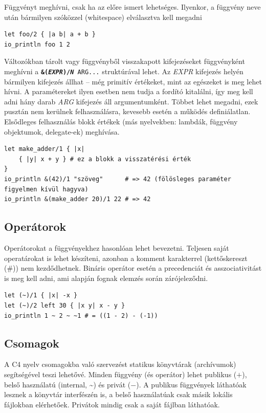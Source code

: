 Függvényt meghívni, csak ha az előre ismert lehetséges.
Ilyenkor, a függvény neve után bármilyen szóközzel (whitespace) elválasztva kell megadni 

\begin{lstlisting}
let foo/2 { |a b| a + b }
io_println foo 1 2
\end{lstlisting}

Változókban tárolt vagy függvényből visszakapott kifejezéseket függvényként meghívni a {\tt{\bf \&({\sl EXPR})/{\sl N}} ARG...} struktúrával lehet.
Az {\sl EXPR} kifejezés helyén bármilyen kifejezés állhat -- még primitív értékeket, mint az egészeket is meg lehet hívni.
A paramétereket ilyen esetben nem tudja a fordító kitalálni, így meg kell adni hány darab {\sl ARG} kifejezés áll argumentumként.
Többet lehet megadni, ezek pusztán nem kerülnek felhasználásra, kevesebb esetén a működés definiálatlan.
Elsődleges felhasználás blokk értékek (más nyelvekben: lambdák, függvény objektumok, delegate-ek) meghívása.

\begin{lstlisting}
let make_adder/1 { |x| 
	{ |y| x + y } # ez a blokk a visszatérési érték
}
io_println &(42)/1 "szöveg"      # => 42 (fölösleges paraméter figyelmen kívül hagyva)
io_println &(make_adder 20)/1 22 # => 42
\end{lstlisting}

\subsection*{Operátorok}

Operátorokat a függvényekhez hasonlóan lehet bevezetni.
Teljesen saját operatárokat is lehet készíteni, azonban a komment karakterrel (kettőskereszt (\#)) nem kezdődhetnek.
Bináris operátor esetén a precedenciát és asszociativitást is meg kell adni, ami alapján fognak elemzés során zárójeleződni.

\begin{lstlisting}
let (~)/1 { |x| -x }
let (~)/2 left 30 { |x y| x - y }
io_println 1 ~ 2 ~ ~1 # = ((1 - 2) - (-1))
\end{lstlisting}

\subsection*{Csomagok}

A C4 nyelv csomagokba való szervezést statikus könyvtárak (archívumok) segítségével teszi lehetővé.
Minden függvény (és operátor) lehet publikus ($+$), belső használatú (internal, \textasciitilde) és privát ($-$).
A publikus függvények láthatóak lesznek a könyvtár interfészén is, a belső használatúak csak másik lokális fájlokban elérhetőek.
Privátok mindig csak a saját fájlban láthatóak.

